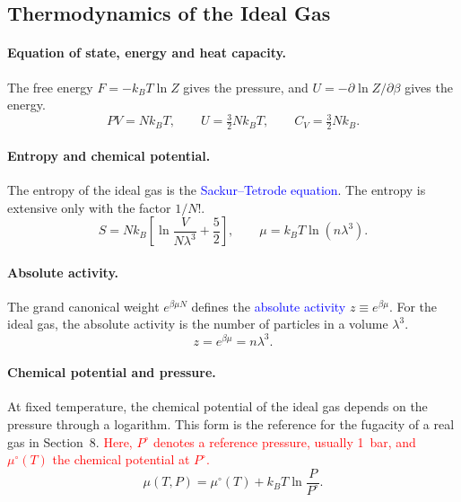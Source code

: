 \subsection{Thermodynamics of the Ideal Gas}

\paragraph{Equation of state, energy and heat capacity.}
The free energy $F=-k_BT\ln Z$ gives the pressure, and
$U=-\partial\ln Z/\partial\beta$ gives the energy.
\begin{equation}
    \boxed{PV=Nk_BT,\qquad U=\tfrac{3}{2}Nk_BT,\qquad C_V=\tfrac{3}{2}Nk_B.}
\end{equation}

\paragraph{Entropy and chemical potential.}
The entropy of the ideal gas is the \textcolor{blue}{Sackur--Tetrode
equation}. The entropy is extensive only with the factor $1/N!$.
\begin{equation}
    \boxed{S=Nk_B\left[\ln\frac{V}{N\lambda^3}+\frac{5}{2}\right],\qquad
    \mu=k_BT\ln\!\left(n\lambda^3\right).}
\end{equation}

\paragraph{Absolute activity.}
The grand canonical weight $e^{\beta\mu N}$ defines the
\textcolor{blue}{absolute activity} $z\equiv e^{\beta\mu}$. For the ideal
gas, the absolute activity is the number of particles in a volume
$\lambda^3$.
\begin{equation}
    \boxed{z=e^{\beta\mu}=n\lambda^3.}
\end{equation}

\paragraph{Chemical potential and pressure.}
At fixed temperature, the chemical potential of the ideal gas depends on
the pressure through a logarithm. This form is the reference for the
fugacity of a real gas in Section~8.
\textcolor{red}{Here, $P^\circ$ denotes a reference pressure, usually
1~bar, and $\mu^\circ(T)$ the chemical potential at $P^\circ$.}
\begin{equation}
    \boxed{\mu(T,P)=\mu^\circ(T)+k_BT\ln\frac{P}{P^\circ}.}
\end{equation}

